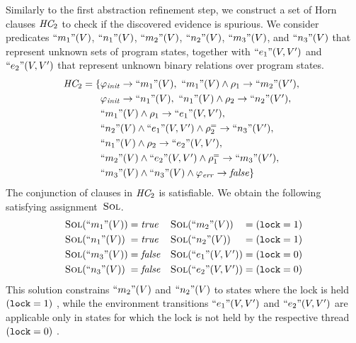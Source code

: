 Similarly to the first abstraction refinement step, we construct a set
of Horn clauses $\textit{HC}_2$ to check if the discovered evidence
is spurious.
We consider predicates $\text{``}m_1\text{''}(V)$, $\text{``}n_1\text{''}(V)$,
$\text{``}m_2\text{''}(V)$, $\text{``}n_2\text{''}(V)$, $\text{``}m_3\text{''}(V)$, and
$\text{``}n_3\text{''}(V)$ that represent unknown sets of program states,
together with $\text{``}e_1\text{''}(V,V')$ and
$\text{``}e_2\text{''}(V,V')$ that represent unknown binary relations
over program states.
%
\begin{equation*}
  \HornClauses_2 = \set{
    \begin{array}[t]{@{}l}
      \SymbInit \limplies \unkOf{m_1}(\Vars),\ 
      \unkOf{m_1}(\Vars) \land \rel_1 \limplies \unkOf{m_2}(\Vars'), \\[\jot]
      \SymbInit \limplies \unkOf{n_1}(\Vars),\ 
      \unkOf{n_1}(\Vars) \land \rel_2 \limplies \unkOf{n_2}(\Vars'), \\[\jot]
      \unkOf{m_1}(\Vars) \land \rel_1 \limplies \unkOf{e_1}(\Vars,\Vars'),
      \\[\jot]
      \unkOf{n_2}(\Vars) \land \unkOf{e_1}(\Vars,\Vars') \land \relLocEqOf{2}
      \limplies \unkOf{n_3}(\Vars'), \\[\jot]
      \unkOf{n_1}(\Vars) \land \rel_2 \limplies \unkOf{e_2}(\Vars,\Vars'),
      \\[\jot]
      \unkOf{m_2}(\Vars) \land \unkOf{e_2}(\Vars,\Vars') \land \relLocEqOf{1}
      \limplies \unkOf{m_3}(\Vars'),\\[\jot]
      \unkOf{m_3}(\Vars) \land \unkOf{n_3}(\Vars) \land \SymbError \limplies 
      \lfalse }
  \end{array}
\end{equation*}
%
The conjunction of clauses in $\textit{HC}_2$ is satisfiable.
We obtain the following satisfying assignment~$\textsc{Sol}$.
%
\begin{equation*}
  \begin{array}[t]{l@{\;=\;}ll@{\;=\;}l}
    \SolutionOf{\unkOf{m_1}(\Vars)}&\ltrue & 
    \SolutionOf{\unkOf{m_2}(\Vars)}&(\lock=1) \\[\jot]
    \SolutionOf{\unkOf{n_1}(\Vars)}&\ltrue &
    \SolutionOf{\unkOf{n_2}(\Vars)}&(\lock=1)\\[\jot]
    \SolutionOf{\unkOf{m_3}(\Vars)}&\lfalse & 
    \SolutionOf{\unkOf{e_1}(\Vars,\Vars')}&(\lock=0) \\[\jot]
    \SolutionOf{\unkOf{n_3}(\Vars)}&\lfalse &
    \SolutionOf{\unkOf{e_2}(\Vars,\Vars')}&(\lock=0)
  \end{array}
\end{equation*}
%
This solution constrains $\text{``}m_2\text{''}(V)$ and $\text{``}n_2\text{''}(V)$
to states where the lock is held $(\mathtt{lock}=1)\ $, while the environment
transitions $\text{``}e_1\text{''}(V,V')$ and
$\text{``}e_2\text{''}(V,V')$ are applicable only in states for which
the lock is not held by the respective thread $(\mathtt{lock}=0)\ $.


